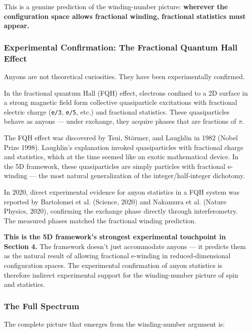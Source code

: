 \documentclass[aps,prd,preprint,superscriptaddress,longbibliography,floatfix]{revtex4-2}
\theoremstyle{remark}
\begin{document}
This is a genuine prediction of the winding-number picture: \textbf{wherever the configuration space allows fractional winding, fractional statistics must appear.}


\subsubsection{Experimental Confirmation: The Fractional Quantum Hall Effect}

Anyons are not theoretical curiosities. They have been experimentally confirmed.

In the fractional quantum Hall (FQH) effect, electrons confined to a 2D surface in a strong magnetic field form collective quasiparticle excitations with fractional electric charge (\texttt{e/3}, \texttt{e/5}, etc.) and fractional statistics. These quasiparticles behave as anyons --- under exchange, they acquire phases that are fractions of $\pi$.

The FQH effect was discovered by Tsui, St\"{o}rmer, and Laughlin in 1982 (Nobel Prize 1998). Laughlin's explanation invoked quasiparticles with fractional charge and statistics, which at the time seemed like an exotic mathematical device. In the 5D framework, these quasiparticles are simply particles with fractional e-winding --- the most natural generalization of the integer/half-integer dichotomy.

In 2020, direct experimental evidence for anyon statistics in a FQH system was reported by Bartolomei et al. (Science, 2020) and Nakamura et al. (Nature Physics, 2020), confirming the exchange phase directly through interferometry. The measured phases matched the fractional winding prediction.

\textbf{This is the 5D framework's strongest experimental touchpoint in Section 4.} The framework doesn't just accommodate anyons --- it predicts them as the natural result of allowing fractional e-winding in reduced-dimensional configuration spaces. The experimental confirmation of anyon statistics is therefore indirect experimental support for the winding-number picture of spin and statistics.


\subsubsection{The Full Spectrum}

The complete picture that emerges from the winding-number argument is:
\end{document}
